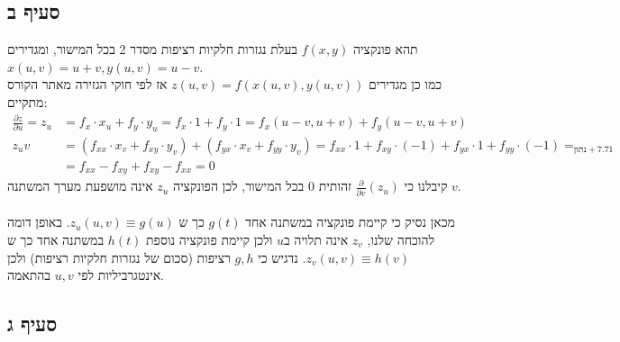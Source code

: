 \documentclass{article}
\DeclareMathOperator*{\equals}{=}
\begin{document}
\subsection*{סעיף ב}

תהא פונקציה $f(x,y)$ בעלת נגזרות חלקיות רציפות מסדר 2 בכל המישור, ומגדירים $x(u,v)=u+v, y(u,v)=u-v$. \\
כמו כן מגדירים $z(u,v)=f(x(u,v), y(u,v))$
אז לפי חוקי הגזירה מאתר הקורס מתקיים:
\begin{align*}
    \frac{\partial z}{\partial u}=z_u & = f_x \cdot x_u + f_y \cdot y_u =
    f_x \cdot 1 + f_y \cdot 1=f_x(u-v, u+v)+f_y(u-v, u+v)                                                                 \\
    z_uv                              & = (f_{xx} \cdot x_v + f_{xy} \cdot y_v) + (f_{yx} \cdot x_v + f_{yy} \cdot y_v) =
    f_{xx} \cdot 1 + f_{xy} \cdot (-1) + f_{yx} \cdot 1 + f_{yy} \cdot (-1) \equals_{\text{נתון} + 7.71}                  \\
                                      & = f_{xx} - f_{xy} + f_{xy} - f_{xx} = 0
\end{align*}
קיבלנו כי $\frac{\partial}{\partial v}(z_u)$ זהותית 0 בכל המישור, לכן הפונקציה $z_u$ אינה מושפעת מערך המשתנה $v$.\\\\
מכאן נסיק כי קיימת פונקציה במשתנה אחד $g(t)$ כך ש $z_u(u,v)\equiv g(u)$.
באופן דומה להוכחה שלנו, $z_v$ אינה תלויה ב$u$ ולכן קיימת פונקציה נוספת $h(t)$ במשתנה אחד כך ש $z_v(u,v)\equiv h(v)$. נדגיש כי $g,h$ רציפות (סכום של נגזרות חלקיות רציפות) ולכן אינטגרביליות לפי $u,v$ בהתאמה.

\subsection*{סעיף ג}
\end{document}
